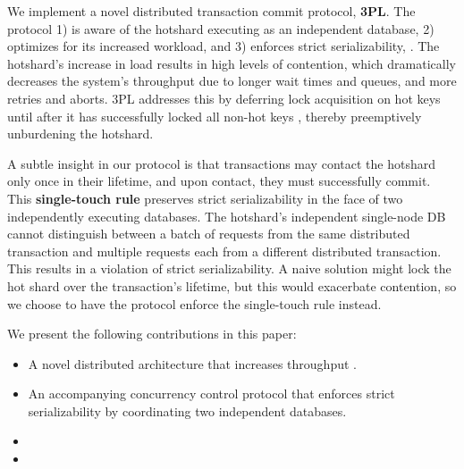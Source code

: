 We implement a novel distributed transaction commit protocol, \textbf{3PL}. The protocol 1) is aware of the hotshard executing as an independent database, 2) optimizes for its increased workload, and 3) enforces strict serializability, . The hotshard's increase in load results in high levels of contention, which dramatically decreases the system's throughput due to longer wait times and queues, and more retries and aborts. 3PL addresses this by deferring lock acquisition on hot keys until after it has successfully locked all non-hot keys \cite{quro}, thereby preemptively unburdening the hotshard. 

A subtle insight in our protocol is that transactions may contact the hotshard only once in their lifetime, and upon contact, they must successfully commit. This \textbf{single-touch rule} preserves strict serializability in the face of two independently executing databases. The hotshard’s independent single-node DB cannot distinguish between a batch of requests from the same distributed transaction and multiple requests each from a different distributed transaction. This results in a violation of strict serializability. A naive solution might lock the hot shard over the transaction’s lifetime, but this would exacerbate contention, so we choose to have the protocol enforce the single-touch rule instead.

 We present the following contributions in this paper:
\begin{itemize}
    \item A novel distributed architecture that increases throughput .
    \item An accompanying concurrency control protocol that enforces strict serializability by coordinating two independent databases.
    \item {}
    \item {}
\end{itemize}

\newline
\newline
\newline
\newline
\newline

